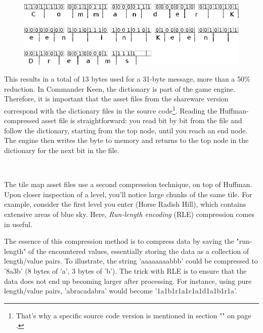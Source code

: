 \documentclass[book.tex]{subfiles}
\begin{document}
\begin{figure}[H]
\centering
 \includegraphics[width=\textwidth]{imgs/drawings/huffman_decode.eps}
 \end{figure}

 \par
This results in a total of 13 bytes used for a 31-byte message, more than a 50\% reduction. In Commander Keen, the dictionary is part of the game engine. Therefore, it is important that the asset files from the shareware version correspond with the dictionary files in the source code\footnote{That's why a specific source code version is mentioned in section "" on page \pageref{section:source_code}.}. Reading the Huffman-compressed asset file is straightforward: you read bit by bit from the file and follow the dictionary, starting from the top node, until you reach an end node. The engine then writes the byte to memory and returns to the top node in the dictionary for the next bit in the file.\\

\par
\begin{minipage}{\textwidth}
 \par
 \end{minipage}\\

\par
The tile map asset files use a second compression technique, on top of Huffman. Upon closer inspection of a level, you'll notice large chunks of the same tile. For example, consider the first level you enter (Horse Radish Hill), which contains extensive areas of blue sky. Here, \textit{Run-length encoding} (RLE) compression comes in useful.\\

\par
The essence of this compression method is to compress data by saving the "run-length" of the encountered values, essentially storing the data as a collection of length/value pairs. To illustrate, the string 'aaaaaaaabbb' could be compressed to '8a3b' (8 bytes of 'a', 3 bytes of 'b'). The trick with RLE is to ensure that the data does not end up becoming larger after processing. For instance, using pure length/value pairs, 'abracadabra' would become '1a1b1r1a1c1a1d1a1b1r1a'.\\
\end{document}
